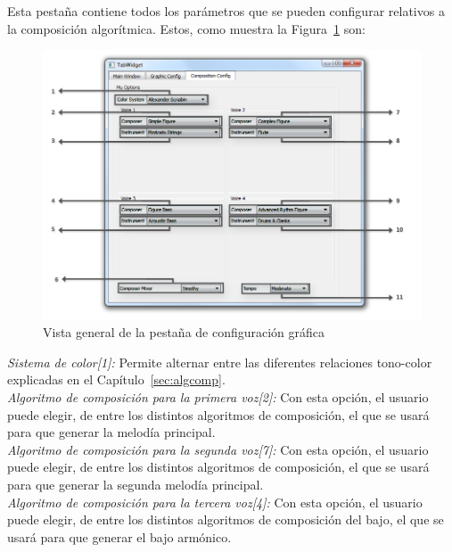 		Esta pestaña contiene todos los parámetros que se pueden configurar relativos a la composición algorítmica. Estos, como muestra la Figura~\ref{fig:interfazcomp} son:\\
		
		\begin{figure}[htbp]
		\centering
		\hspace*{-0.9in}
		\includegraphics[scale=0.57]{graphics/interfazcomp.png}
		\caption{Vista general de la pestaña de configuración gráfica}
		\label{fig:interfazcomp}
		\end{figure}
		
		\noindent\textit{Sistema de color[1]:} Permite alternar entre las diferentes relaciones tono-color explicadas en el Capítulo~\ref{sec:algcomp}.\\
		
		\noindent\textit{Algoritmo de composición para la primera voz[2]:} Con esta opción, el usuario puede elegir, de entre los distintos algoritmos de composición, el que se usará para que generar la melodía principal.\\
		
		\noindent\textit{Algoritmo de composición para la segunda voz[7]:} Con esta opción, el usuario puede elegir, de entre los distintos algoritmos de composición, el que se usará para que generar la segunda melodía principal.\\

		\noindent\textit{Algoritmo de composición para la tercera voz[4]:} Con esta opción, el usuario puede elegir, de entre los distintos algoritmos de composición del bajo, el que se usará para que generar el bajo armónico.\\
		
